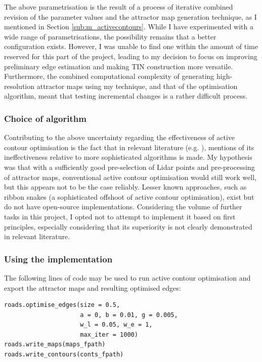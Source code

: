 The above parametrisation is the result of a process of iterative combined revision of the parameter values and the attractor map generation technique, as I mentioned in Section \ref{sub:m_activecontours}. While I have experimented with a wide range of parametrisations, the possibility remains that a better configuration exists. However, I was unable to find one within the amount of time reserved for this part of the project, leading to my decision to focus on improving preliminary edge estimation and making TIN construction more versatile. Furthermore, the combined computational complexity of generating high-resolution attractor maps using my technique, and that of the optimisation algorithm, meant that testing incremental changes is a rather difficult process.

\subsubsection{Choice of algorithm}

Contributing to the above uncertainty regarding the effectiveness of active contour optimisation is the fact that in relevant literature (e.g. \cite{boyko_funkhauser_2011}), mentions of its ineffectiveness relative to more sophisticated algorithms is made. My hypothesis was that with a sufficiently good pre-selection of Lidar points and pre-processing of attractor maps, conventional active contour optimisation would still work well, but this appears not to be the case reliably. Lesser known approaches, such as ribbon snakes (a sophisticated offshoot of active contour optimisation), exist but do not have open-source implementations. Considering the volume of further tasks in this project, I opted not to attempt to implement it based on first principles, especially considering that its superiority is not clearly demonstrated in relevant literature.

\subsubsection{Using the implementation}

The following lines of code may be used to run active contour optimisation and export the attractor maps and resulting optimised edges:

\begin{lstlisting}
roads.optimise_edges(size = 0.5,
                     a = 0, b = 0.01, g = 0.005,
                     w_l = 0.05, w_e = 1,
                     max_iter = 1000)
roads.write_maps(maps_fpath)
roads.write_contours(conts_fpath)
\end{lstlisting}

